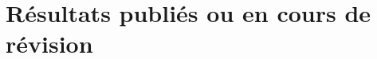 \documentclass[\main/main.tex]{subfiles}
\begin{document}
\chapter{Résultats publiés ou en cours de révision}






\end{document}
